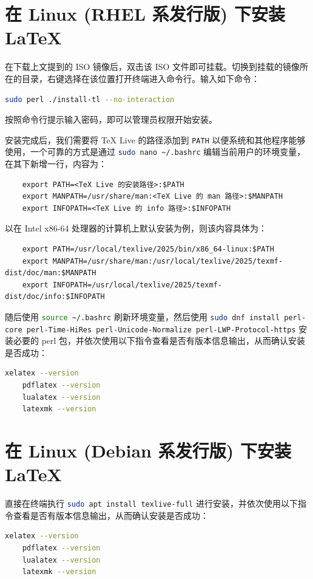 \section{在 Linux (RHEL 系发行版) 下安装 \LaTeX{}}
\label{Installation_LaTeX_RHEL}

在下载上文提到的 ISO 镜像后，双击该 ISO 文件即可挂载。切换到挂载的镜像所在的目录，右键选择在该位置打开终端进入命令行。输入如下命令：
\begin{lstlisting}[language=bash]
    sudo perl ./install-tl --no-interaction
\end{lstlisting}

按照命令行提示输入密码，即可以管理员权限开始安装。

安装完成后，我们需要将 TeX Live 的路径添加到 \texttt{PATH} 以便系统和其他程序能够使用，一个可靠的方式是通过 \lstinline[language=bash]!sudo nano ~/.bashrc! 编辑当前用户的环境变量，在其下新增一行，内容为：
\begin{lstlisting}
    export PATH=<TeX Live 的安装路径>:$PATH
    export MANPATH=/usr/share/man:<TeX Live 的 man 路径>:$MANPATH
    export INFOPATH=<TeX Live 的 info 路径>:$INFOPATH
\end{lstlisting}

以在 Intel x86-64 处理器的计算机上默认安装为例，则该内容具体为：
\begin{lstlisting}
    export PATH=/usr/local/texlive/2025/bin/x86_64-linux:$PATH
    export MANPATH=/usr/share/man:/usr/local/texlive/2025/texmf-dist/doc/man:$MANPATH
    export INFOPATH=/usr/local/texlive/2025/texmf-dist/doc/info:$INFOPATH
\end{lstlisting}

随后使用 \lstinline[language=bash]!source ~/.bashrc! 刷新环境变量，然后使用 \lstinline[language=bash]!sudo dnf install perl-core perl-Time-HiRes perl-Unicode-Normalize perl-LWP-Protocol-https! 安装必要的 perl 包，并依次使用以下指令查看是否有版本信息输出，从而确认安装是否成功：
\begin{lstlisting}[language=bash]
    xelatex --version
    pdflatex --version
    lualatex --version
    latexmk --version
\end{lstlisting}

\section{在 Linux (Debian 系发行版) 下安装 \LaTeX{}}
\label{Installation_LaTeX_Debian}

直接在终端执行 \lstinline[language=bash]!sudo apt install texlive-full! 进行安装，并依次使用以下指令查看是否有版本信息输出，从而确认安装是否成功：
\begin{lstlisting}[language=bash]
    xelatex --version
    pdflatex --version
    lualatex --version
    latexmk --version
\end{lstlisting}

